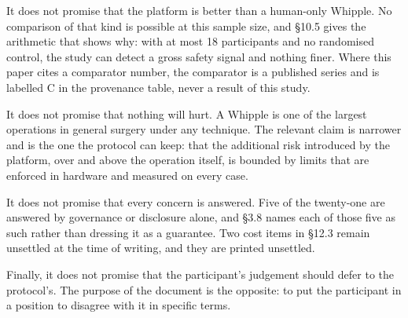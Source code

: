 It does not promise that the platform is better than a human-only Whipple. No
comparison of that kind is possible at this sample size, and \S 10.5 gives the
arithmetic that shows why: with at most 18 participants and no randomised
control, the study can detect a gross safety signal and nothing finer. Where
this paper cites a comparator number, the comparator is a published series and
is labelled C in the provenance table, never a result of this study.

It does not promise that nothing will hurt. A Whipple is one of the largest
operations in general surgery under any technique. The relevant claim is
narrower and is the one the protocol can keep: that the additional risk
introduced by the platform, over and above the operation itself, is bounded by
limits that are enforced in hardware and measured on every case.

It does not promise that every concern is answered. Five of the twenty-one are
answered by governance or disclosure alone, and \S 3.8 names each of those five
as such rather than dressing it as a guarantee. Two cost items in \S 12.3 remain
unsettled at the time of writing, and they are printed unsettled.

Finally, it does not promise that the participant's judgement should defer to
the protocol's. The purpose of the document is the opposite: to put the
participant in a position to disagree with it in specific terms.
